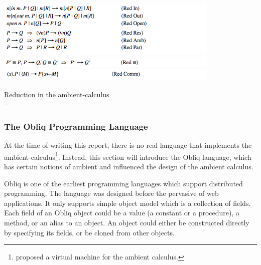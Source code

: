 \begin{table} [p]
  \begin{center}
  \includegraphics[scale=1]{ambient_red_1.png}
  \includegraphics[scale=1]{ambient_red_2.png}
  \includegraphics[scale=1]{ambient_red_3.png}
  \end{center}
  \captionsetup{justification=centering}    
  \caption{Reduction in the ambient-calculus \\ -- \citep{Cardelli98mobileambients}}
  \label{ambient-red}
\end{table}

\subsubsection{The Obliq Programming Language}
At the time of writing this report, there is no real language that implements the ambient-calculus\footnote{\citet{VMAmbient} proposed a virtual machine for the ambient calculus.}.  Instead,  this section will introduce the Obliq language, which has certain notions of ambient and influenced the design of the ambient calculus.

Obliq\citep{obliq} is one of the earliest programming languages which support distributed programming.  The language was designed before the pervasive of web applications.  It only supports simple object model which is a collection of fields.  Each field of an Obliq object could be a value (a constant or a procedure), a method, or an alias to an object.  An object could either be constructed directly by specifying its fields, or be cloned from other objects.  

